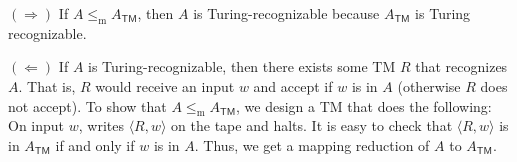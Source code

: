 \begin{enumerate}[start=8,font=\bfseries,label=5.\arabic*]
    $(\Rightarrow)$ If $A \le_\mathrm m A_\textsf{TM}$, then $A$ is Turing-recognizable because $A_\textsf{TM}$ is Turing recognizable.
    
    $(\Leftarrow)$ If $A$ is Turing-recognizable, then there exists some \textsf{TM} $R$ that recognizes $A$. That is, $R$ would receive an input $w$ and accept if $w$ is in $A$ (otherwise $R$ does not accept). To show that $A \le_\mathrm m A_\textsf{TM}$, we design a \textsf{TM} that does the following: On input $w$, writes $\langle R,w\rangle$ on the tape and halts. It is easy to check that $\langle R,w\rangle$ is in $A_\textsf{TM}$ if and only if $w$ is in $A$. Thus, we get a mapping reduction of $A$ to $A_\textsf{TM}$.
    
\end{enumerate}